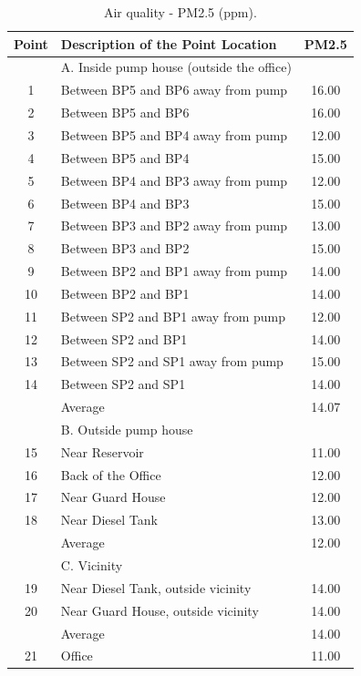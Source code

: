 \begin{table}[!h]
	\caption{Air quality - PM2.5 (ppm).}
	\label{ch04_tbl_wem03}
	{\footnotesize
\begin{tabular}{c|l|c}
	\hline
	Point & Description of the Point Location & PM2.5 \\ 
	\hline
	& A. Inside pump house (outside the office) &  \\ 
	1 & Between BP5 and BP6 away from pump & 16.00 \\ 
	2 & Between BP5 and BP6 & 16.00 \\ 
	3 & Between BP5 and BP4 away from pump & 12.00 \\ 
	4 & Between BP5 and BP4 & 15.00 \\ 
	5 & Between BP4 and BP3 away from pump & 12.00 \\ 
	6 & Between BP4 and BP3 & 15.00 \\ 
	7 & Between BP3 and BP2 away from pump & 13.00 \\ 
	8 & Between BP3 and BP2 & 15.00 \\ 
	9 & Between BP2 and BP1 away from pump & 14.00 \\ 
	10 & Between BP2 and BP1 & 14.00 \\ 
	11 & Between SP2 and BP1 away from pump & 12.00 \\ 
	12 & Between SP2 and BP1 & 14.00 \\ 
	13 & Between SP2 and SP1 away from pump & 15.00 \\ 
	14 & Between SP2 and SP1 & 14.00 \\ 
	& Average & 14.07 \\ 
	\hline
	& B. Outside pump house &  \\ 
	15 & Near Reservoir & 11.00 \\ 
	16 & Back of the Office & 12.00 \\ 
	17 & Near Guard House & 12.00 \\ 
	18 & Near Diesel Tank & 13.00 \\ 
	& Average & 12.00 \\ 
	\hline
	& C. Vicinity &  \\ 
	19 & Near Diesel Tank, outside vicinity & 14.00 \\ 
	20 & Near Guard House, outside vicinity & 14.00 \\ 
	& Average & 14.00 \\ 
	\hline
	21 & Office & 11.00 \\ 
	\hline
\end{tabular}
	}
\end{table}

